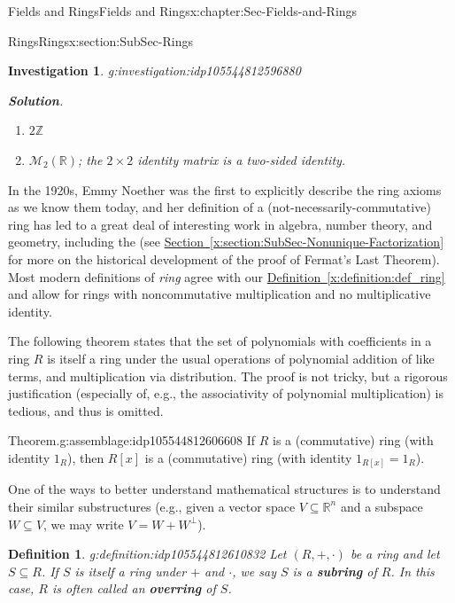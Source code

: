 \documentclass[oneside,10pt,]{book}
\newcommand{\blocktitlefont}{\relax}
\newcommand{\xreffont}{\relax}
\newcommand{\terminology}[1]{\textbf{#1}}
\numberwithin{equation}{section}
\def\Z{{\mathbb Z}}
\def\R{{\mathbb R}}
\newtheorem{definition}[theorem]{Definition}
\newtheorem{investigation}[theorem]{Investigation}
\begin{document}
\begin{chapterptx}{Fields and Rings}{}{Fields and Rings}{}{}{x:chapter:Sec-Fields-and-Rings}
\begin{sectionptx}{Rings}{}{Rings}{}{}{x:section:SubSec-Rings}
\begin{investigation}{}{g:investigation:idp105544812596880}
%
\par\smallskip%
\noindent\textbf{\blocktitlefont Solution}.\hypertarget{g:solution:idp105544812601232}{}\quad{}%
\begin{enumerate}
\item{}\(\displaystyle 2\Z\)%
\item{}\(\mathcal{M}_2(\R)\); the \(2\times 2\) identity matrix is a two-sided identity.%
\end{enumerate}
%
\end{investigation}%
%
%
In the 1920s, Emmy Noether was the first to explicitly describe the ring axioms as we know them today, and her definition of a (not-necessarily-commutative) ring has led to a great deal of interesting work in algebra, number theory, and geometry, including the (see \hyperref[x:section:SubSec-Nonunique-Factorization]{Section~{\xreffont\ref{x:section:SubSec-Nonunique-Factorization}}} for more on the historical development of the proof of Fermat's Last Theorem). Most modern definitions of \emph{ring} agree with our \hyperref[x:definition:def_ring]{Definition~{\xreffont\ref{x:definition:def_ring}}} and allow for rings with noncommutative multiplication and no multiplicative identity.%
\par
The following theorem states that the set of polynomials with coefficients in a ring \(R\) is itself a ring under the usual operations of polynomial addition of like terms, and multiplication via distribution. The proof is not tricky, but a rigorous justification (especially of, e.g., the associativity of polynomial multiplication) is tedious, and thus is omitted.%
\begin{assemblage}{Theorem.}{g:assemblage:idp105544812606608}%
If \(R\) is a (commutative) ring (with identity \(1_R\)), then \(R[x]\) is a (commutative) ring (with identity \(1_{R[x]} = 1_R\)).%
\end{assemblage}
One of the ways to better understand mathematical structures is to understand their similar substructures (e.g., given a vector space \(V\subseteq \R^n\) and a subspace \(W\subseteq V\), we may write \(V = W + W^\perp\)). %
\begin{definition}{}{g:definition:idp105544812610832}%
%
%
Let \((R,+,\cdot)\) be a ring and let \(S\subseteq R\). If \(S\) is itself a ring under \(+\) and \(\cdot\), we say \(S\) is a \terminology{subring} of \(R\). In this case, \(R\) is often called an \terminology{overring} of \(S\).%

\end{definition}
\end{sectionptx}
\end{chapterptx}
\end{document}
